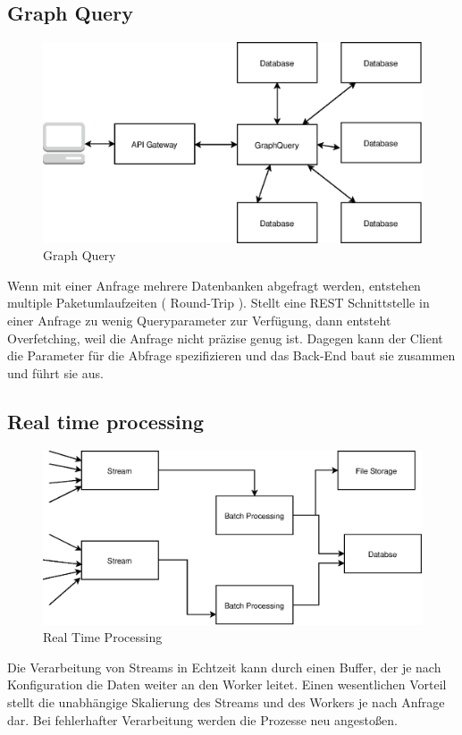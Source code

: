 \documentclass[
12pt,
english,
ngerman,
headsepline,
twoside,
openright,
numbers=noenddot,version=first
]{scrreprt}
\begin{document}
\subsection{Graph Query}
\begin{figure}
	\includegraphics[scale=0.36]{./pics/GraphQuery.eps}
	\caption{Graph Query}
	\label{pic:graph-query}
\end{figure}
Wenn mit einer Anfrage mehrere Datenbanken abgefragt werden, entstehen multiple Paketumlaufzeiten ( Round-Trip ). Stellt eine \acrshort{REST} Schnittstelle in einer Anfrage zu wenig Queryparameter zur Verfügung, dann entsteht Overfetching, weil die Anfrage nicht präzise genug ist. Dagegen kann der Client die Parameter für die Abfrage spezifizieren und das Back-End baut sie zusammen und führt sie aus.


\subsection{Real time processing}
\begin{figure}
	\includegraphics[scale=0.36]{./pics/real-time-processing.eps}
	\caption{Real Time Processing}
	\label{pic:real-time-processing}
\end{figure}
Die Verarbeitung von Streams in Echtzeit kann durch einen Buffer, der je nach Konfiguration die Daten weiter an den Worker leitet. Einen wesentlichen Vorteil stellt die unabhängige Skalierung des Streams und des Workers je nach Anfrage dar. Bei fehlerhafter Verarbeitung werden die Prozesse neu angestoßen.
\\
\\
\end{document}
